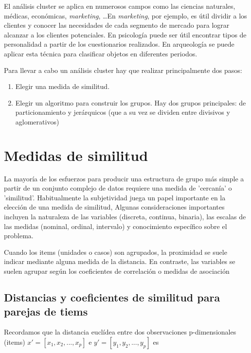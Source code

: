 \documentclass[a4paper, 20pt]{article}
\begin{document}
El análisis cluster se aplica en numerosos campos como las ciencias naturales, médicas, económicas, \textit{marketing}, \dots En \textit{marketing}, por ejemplo, es útil dividir a los clientes y conocer las necesidades de cada segmento de mercado para lograr alcanzar a los clientes potenciales. En psicología puede ser útil encontrar tipos de personalidad a partir de los cuestionarios realizados. En arqueología se puede aplicar esta técnica para clasificar objetos en diferentes periodos.

Para llevar a cabo un análisis cluster hay que realizar principalmente dos pasos:

\begin{enumerate}
\item Elegir una medida de similitud.
\item Elegir un algoritmo para construir los grupos. Hay dos grupos principales: de particionamiento y jerárquicos (que a su vez se dividen entre divisivos y aglomerativos)
\end{enumerate}

\section{Medidas de similitud}\label{sec:medidas de similitud}

La mayoría de los esfuerzos para producir una estructura de grupo más simple a partir de un conjunto complejo de datos requiere una medida de 'cercanía' o  'similitud'. Habitualmente la subjetividad juega un papel importante en la elección de una medida de similitud, Algunas consideraciones importantes incluyen la naturaleza de las variables (discreta, continua, binaria), las escalas de las medidas (nominal, ordinal, intervalo) y conocimiento específico sobre el problema.

Cuando los items (unidades o casos) son agrupados, la proximidad se suele indicar mediante alguna medida de la distancia. En contraste, las variables se suelen agrupar según los coeficientes de correlación o medidas de asociación

\subsection{Distancias y coeficientes de similitud para parejas de tiems}

Recordamos que la distancia euclídea entre dos observaciones p-dimensionales (items) $x' = [x_1,x_2,...,x_p]$ e $y'=[y_1,y_2,...,y_p]$ es
\end{document}
